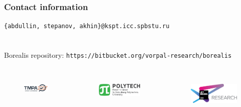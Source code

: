 
\begin{frame}[fragile]
\frametitle{Contact information}
\texttt{\{abdullin, stepanov, akhin\}@kspt.icc.spbstu.ru} \\ \ \\ \ \\
Borealis repository: \texttt{https://bitbucket.org/vorpal-research/borealis}
\\ \ \\ 
\begin{columns} 
	\begin{figure}
		\includegraphics[width=0.99\linewidth]{image/tmpalogo} 
	\end{figure}
	\begin{figure}
		\includegraphics[width=0.99\linewidth]{image/polytech_logo_en} 
	\end{figure}
	\begin{figure}
		\includegraphics[width=0.99\linewidth]{image/jetbrainsLogo} 
	\end{figure}
\end{columns}
\end{frame}


